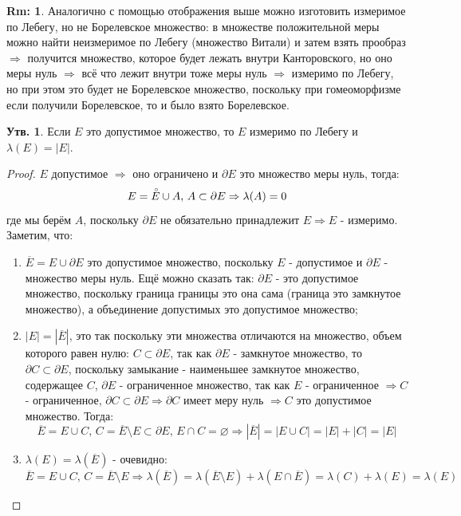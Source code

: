 \documentclass[12pt]{article}
\newcommand{\VN}{\varnothing}
\theoremstyle{definition}
\newtheorem{rem}{Rm:}
\newtheorem{prop}{Утв.}
\newcommand{\ovl}[1]{\overline{#1}}
\newcommand{\Circ}[1]{\accentset{\circ}{#1}}
\begin{document}
\begin{rem}
	Аналогично с помощью отображения выше можно изготовить измеримое по Лебегу, но не Борелевское множество: в множестве положительной меры можно найти неизмеримое по Лебегу (множество Витали) и затем взять прообраз $\Rightarrow$ получится множество, которое будет лежать внутри Канторовского, но оно меры нуль $\Rightarrow$ всё что лежит внутри тоже меры нуль $\Rightarrow$ измеримо по Лебегу, но при этом это будет не Борелевское множество, поскольку при гомеоморфизме если получили Борелевское, то и было взято Борелевское.
\end{rem}
\begin{prop}
	Если $E$ это допустимое множество, то $E$ измеримо по Лебегу и $\lambda(E) = |E|$.
\end{prop}
\begin{proof}
	$E$ допустимое $\Rightarrow$ оно ограничено и $\partial E$ это множество меры нуль, тогда:
	$$
		E = \Circ{E} \cup A, \, A \subset \partial E \Rightarrow \lambda(A) = 0
	$$
	где мы берём $A$, поскольку $\partial E$ не обязательно принадлежит $E \Rightarrow E$ - измеримо. Заметим, что: 
	\begin{enumerate}[label=\arabic*)]
		\item $\ovl{E} = E \cup \partial E$ это допустимое множество, поскольку $E$ - допустимое и $\partial E$ - множество меры нуль. Ещё можно сказать так: $\partial E$ - это допустимое множество, поскольку граница границы это она сама (граница это замкнутое множество), а объединение допустимых это допустимое множество;
		\item $|E| = |\ovl{E}|$, это так поскольку эти множества отличаются на множество, объем которого равен нулю: $C \subset \partial E$, так как $\partial E$ - замкнутое множество, то $\partial C \subset \partial E$, поскольку замыкание - наименьшее замкнутое множество, содержащее $C$, $\partial E$ - ограниченное множество, так как $E$ - ограниченное $\Rightarrow C$ - ограниченное, $\partial C \subset \partial E \Rightarrow \partial C$ имеет меру нуль $\Rightarrow C$ это допустимое множество. Тогда: 
		$$
			\ovl{E} = E \cup C, \, C = \ovl{E}\setminus E \subset \partial E, \, E \cap C = \VN \Rightarrow |\ovl{E}| = |E \cup C| = |E| + |C| = |E|
		$$
		\item $\lambda(E) = \lambda(\ovl{E})$ - очевидно:
		$$
			\ovl{E} = E \cup C, \, C = \ovl{E}\setminus E \Rightarrow \lambda(\ovl{E}) = \lambda(\ovl{E}\setminus E) + \lambda(E \cap \ovl{E}) = \lambda(C) + \lambda(E) = \lambda(E)
		$$
	\end{enumerate}

\end{proof}
\end{document}
